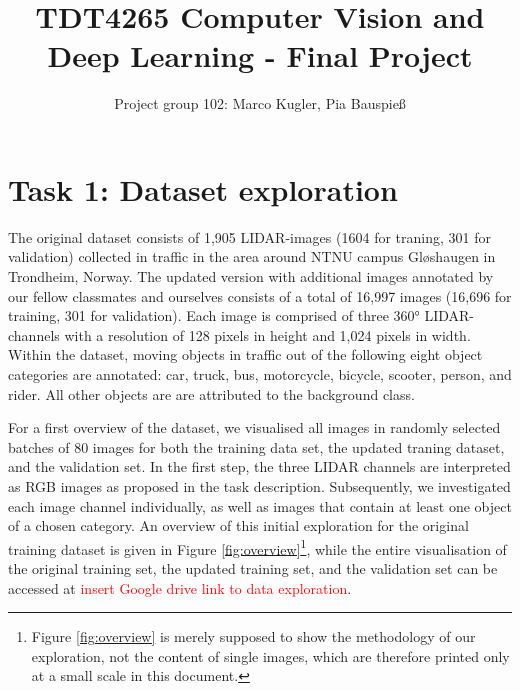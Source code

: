 \documentclass{article}
\title{TDT4265 Computer Vision and Deep Learning - Final Project}
\author{Project group 102: Marco Kugler, Pia Bauspieß}
\begin{document}
\maketitle
\section*{Task 1: Dataset exploration}

The original dataset consists of 1,905 LIDAR-images (1604 for traning, 301 for validation) collected in traffic in the area around NTNU campus Gløshaugen in Trondheim, Norway. The updated version with additional images annotated by our fellow classmates and ourselves consists of a total of 16,997 images (16,696 for training, 301 for validation). Each image is comprised of three 360° LIDAR-channels with a resolution of 128 pixels in height and 1,024 pixels in width. Within the dataset, moving objects in traffic out of the following eight object categories are annotated: car, truck, bus, motorcycle, bicycle, scooter, person, and rider. All other objects are are attributed to the background class.

For a first overview of the dataset, we visualised all images in randomly selected batches of 80 images for both the training data set, the updated traning dataset, and the validation set. In the first step, the three LIDAR channels are interpreted as RGB images as proposed in the task description. Subsequently, we investigated each image channel individually, as well as images that contain at least one object of a chosen category. An overview of this initial exploration for the original training dataset is given in Figure \ref{fig:overview}\footnote{Figure \ref{fig:overview} is merely supposed to show the methodology of our exploration, not the content of single images, which are therefore printed only at a small scale in this document.}, while the entire visualisation of the original training set, the updated training set, and the validation set can be accessed at \textcolor{red}{insert Google drive link to data exploration}.
\end{document}
